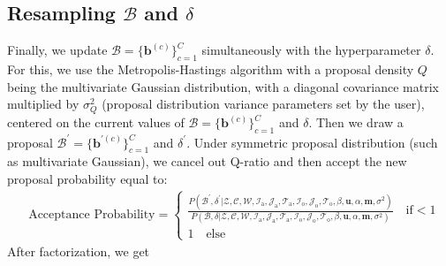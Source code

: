 \documentclass[a4paper]{article}
\begin{document}
 \subsection{Resampling $\mathcal{B}$ and  $\delta$}  \label{subsec: Resampling B}
 Finally, we update $\mathcal{B}=\{\boldsymbol{b}^{(c)}\}_{c=1}^C$ simultaneously with the hyperparameter $\delta$. For this, we use the Metropolis-Hastings algorithm with a proposal density $Q$ being the multivariate Gaussian distribution, with a diagonal covariance matrix multiplied by $\sigma^2_Q$ (proposal distribution variance parameters set by the user), centered on the current values of $\mathcal{B}=\{\boldsymbol{b}^{(c)}\}_{c=1}^C$ and $\delta$. Then we draw a proposal $\mathcal{B}^\prime=\{\boldsymbol{b}^{\prime(c)}\}_{c=1}^C$ and $\delta^\prime$. Under symmetric proposal distribution (such as multivariate Gaussian), we cancel out Q-ratio and then accept the new proposal probability equal to:
 \begin{equation}
 \begin{split}
 & \mbox{Acceptance Probability}=
 \begin{cases}  \frac{P(\mathcal{B}^\prime, \delta^\prime|\mathcal{Z},   \mathcal{C},  \mathcal{W}, \mathcal{I}_{\mbox{a}}, \mathcal{J}_{\mbox{a}}, \mathcal{T}_{\mbox{a}}, \mathcal{I}_{\mbox{o}}, \mathcal{J}_{\mbox{o}}, \mathcal{T}_{\mbox{o}}, \beta, \boldsymbol{u}, \alpha, \boldsymbol{m}, \sigma^2)}{P(\mathcal{B},  \delta|\mathcal{Z},   \mathcal{C},  \mathcal{W}, \mathcal{I}_{\mbox{a}}, \mathcal{J}_{\mbox{a}}, \mathcal{T}_{\mbox{a}}, \mathcal{I}_{\mbox{o}}, \mathcal{J}_{\mbox{o}}, \mathcal{T}_{\mbox{o}}, \beta, \boldsymbol{u}, \alpha, \boldsymbol{m}, \sigma^2)}\quad\text{if}  <1\\
 1 \quad \text{else}
 \end{cases}
 \end{split}
 \end{equation}
 After factorization, we get
\end{document}
